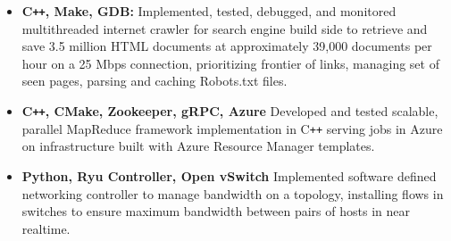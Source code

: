 \documentclass[overlapped]{res}
\begin{document}
\begin{resume}
\begin{itemize}[label={}]  \itemsep -2pt %
    \item \textbf{C\texttt{++}, Make, GDB:}
        Implemented, tested, debugged, and monitored multithreaded internet crawler
        for search engine build side to retrieve and save 3.5 million HTML documents
        at approximately 39,000 documents per hour on a 25 Mbps connection,
        prioritizing frontier of links, managing set of seen pages, parsing and caching Robots.txt files.
    \item \textbf{C\texttt{++}, CMake, Zookeeper, gRPC, Azure}
        Developed and tested scalable, parallel MapReduce framework implementation in C\texttt{++}
        serving jobs in Azure on infrastructure built with Azure Resource Manager templates.
    \item \textbf{Python, Ryu Controller, Open vSwitch}
        Implemented software defined networking controller to manage bandwidth on a topology, installing flows
        in switches to ensure maximum bandwidth between pairs of hosts in near realtime.

\end{itemize}
\end{resume}
\end{document}
